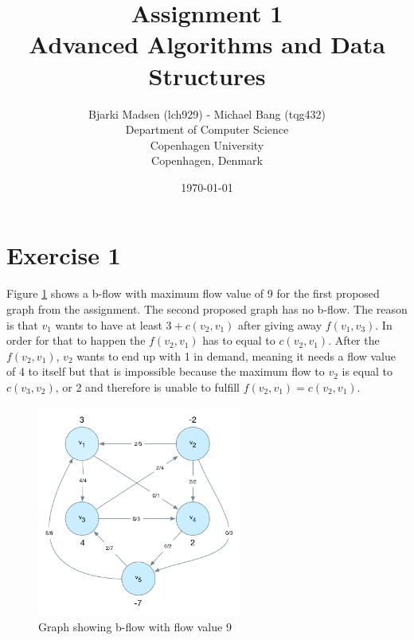 \documentclass[12pt]{article}
\newcommand{\assignmentname}{Assignment 1}
\newcommand{\coursename}{Advanced Algorithms and Data Structures}
\newcommand{\studentname}{Bjarki Madsen (lch929) - Michael Bang (tqg432)}
\newcommand{\department}{Department of Computer Science}
\newcommand{\institution}{Copenhagen University}
\newcommand{\location}{Copenhagen, Denmark}
\begin{document}
\renewcommand\refname{References}

\title{\assignmentname \\ {\Large {\textsc \coursename}}}
\author{
        \studentname \\
        \department \\
        \institution \\
        \location
}
\date{\today}

\maketitle
\thispagestyle{empty}

\pagebreak

\section*{Exercise 1}

  Figure \ref{fig:e1_a_solution} shows a b-flow with maximum flow value of 9 for the first proposed graph from the assignment. The second proposed graph has no b-flow. The reason is that $v_1$ wants to have at least $3 + c(v_2, v_1)$ after giving away $f(v_1, v_3)$. In order for that to happen the $f(v_2, v_1)$ has to equal to $c(v_2, v_1)$. After the $f(v_2, v_1)$, $v_2$ wants to end up with 1 in demand, meaning it needs a flow value of 4 to itself but that is impossible because the maximum flow to $v_2$ is equal to $c(v_3, v_2)$, or 2 and therefore is unable to fulfill $f(v_2, v_1) = c(v_2, v_1)$.

  \begin{figure}[h]
    \centering
      \includegraphics[width=0.6\textwidth]{figures/e1_a_solution}
    \caption{Graph showing b-flow with flow value 9}
    \label{fig:e1_a_solution}
  \end{figure}
\end{document}
